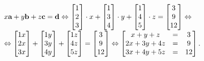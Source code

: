 \documentclass[a4paper,11.5pt]{article}
\begin{document}
	{\centering
		$x\a + y\b + z\c = \d \Leftrightarrow 
		\begin{bmatrix}
		1\s \\
		2\s \\
		3\s \\
		\end{bmatrix}\cdot x+
		\begin{bmatrix}
		1\s \\
		3\s \\
		4\s \\
		\end{bmatrix}\cdot y+
		\begin{bmatrix}
		1\s \\
		4\s \\
		5\s \\
		\end{bmatrix}\cdot z=
		\begin{bmatrix}
		3\s \\
		9\s \\
		12\s \\
		\end{bmatrix}\Leftrightarrow$ \\ $ \Leftrightarrow
		\begin{bmatrix}
		1x\s \\
		2x\s \\
		3x\s \\
		\end{bmatrix}+
		\begin{bmatrix}
		1y\s \\
		3y\s \\
		4y\s \\
		\end{bmatrix}+
		\begin{bmatrix}
		1z\s \\
		4z\s \\
		5z\s \\
		\end{bmatrix}=
		\begin{bmatrix}
		3\s \\
		9\s \\
		12\s \\
		\end{bmatrix} \Leftrightarrow
		\begin{bmatrix} 
			x + y + z &=& 3\\
			2x + 3y + 4z &=& 9\\
			3x + 4y + 5z& =& 12
		\end{bmatrix}.
		$
		\par}
	
\end{document}

